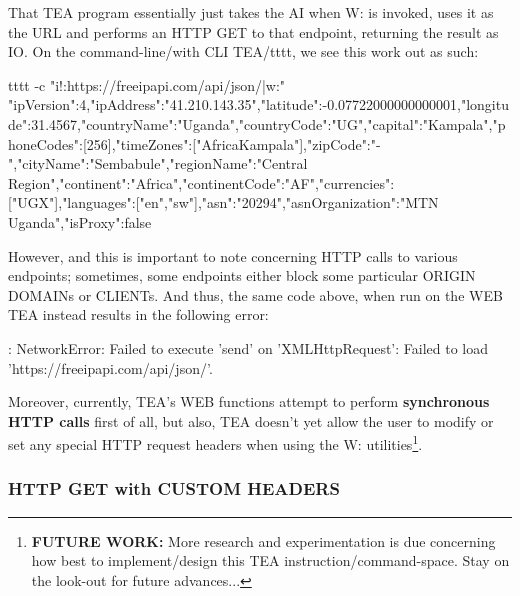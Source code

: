 \documentclass[a4paper, 18pt]{book} %
\begin{document}
{{{\vspace{1em}


That TEA program essentially just takes the AI when W: is invoked, uses it as the URL and performs an HTTP GET to that endpoint, returning the result as IO. On the command-line/with CLI TEA/tttt, we see this work out as such:


\vspace{2em}
 \begin{tcbverbatim}[title=W: EXAMPLE 11: Testing WEB functionality on the Command-line]
tttt -c "i!:https://freeipapi.com/api/json/|w:"
{"ipVersion":4,"ipAddress":"41.210.143.35","latitude":-0.07722000000000001,"longitude":31.4567,"countryName":"Uganda","countryCode":"UG","capital":"Kampala","phoneCodes":[256],"timeZones":["Africa\/Kampala"],"zipCode":"-","cityName":"Sembabule","regionName":"Central Region","continent":"Africa","continentCode":"AF","currencies":["UGX"],"languages":["en","sw"],"asn":"20294","asnOrganization":"MTN Uganda","isProxy":false}
  \end{tcbverbatim}
\vspace{2em}


However, and this is important to note concerning HTTP calls to various endpoints; sometimes, some endpoints either block some particular ORIGIN DOMAINs or CLIENTs. And thus, the same code above, when run on the WEB TEA instead results in the following error:


  
 \vspace{2em}
 \begin{tcbverbatim}[title=Sample OUTPUT 11]
[ERROR]: NetworkError: Failed to execute 'send' on 'XMLHttpRequest': Failed to load 'https://freeipapi.com/api/json/'.
  \end{tcbverbatim}
 \vspace{2em}


Moreover, currently, TEA's WEB functions attempt to perform \textbf{synchronous HTTP calls} first of all, but also, TEA doesn't yet allow the user to modify or set any special HTTP request headers when using the W: utilities\footnote{\textbf{FUTURE WORK:} More research and experimentation is due concerning how best to implement/design this TEA instruction/command-space. Stay on the look-out for future advances...}. 


\subsubsection{HTTP GET with CUSTOM HEADERS}


}}}
\end{document}
